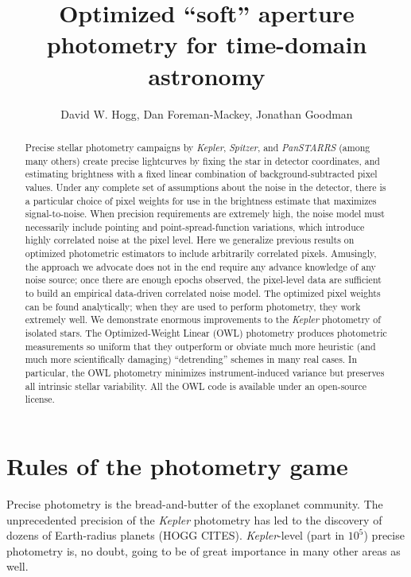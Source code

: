 \documentclass[12pt, letterpaper, preprint]{aastex}
\newcommand{\project}[1]{\textsl{#1}}
\begin{document}
\sloppy\sloppypar

\title{
  Optimized ``soft'' aperture photometry for time-domain astronomy
}
\author{
  David W. Hogg,
  Dan Foreman-Mackey,
  Jonathan Goodman
}

\begin{abstract}
Precise stellar photometry campaigns by \project{Kepler}, \project{Spitzer}, and \project{PanSTARRS}
  (among many others)
  create precise lightcurves by fixing the star in detector coordinates,
  and estimating brightness with a fixed linear combination of background-subtracted pixel values.
Under any complete set of assumptions about the noise in the detector,
  there is a particular choice of pixel weights for use in the brightness estimate
  that maximizes signal-to-noise.
When precision requirements are extremely high,
  the noise model must necessarily include pointing and point-spread-function variations,
  which introduce highly correlated noise at the pixel level.
Here we generalize previous results on optimized photometric estimators
  to include arbitrarily correlated pixels.
Amusingly, the approach we advocate does not in the end
  require any advance knowledge of any noise source;
  once there are enough epochs observed,
  the pixel-level data are sufficient to build an empirical data-driven correlated noise model.
The optimized pixel weights can be found analytically;
  when they are used to perform photometry, they work extremely well.
We demonstrate enormous improvements to the \project{Kepler} photometry of isolated stars.
The Optimized-Weight Linear (OWL) photometry produces photometric measurements so uniform that
  they outperform or obviate much more heuristic (and much more scientifically damaging)
  ``detrending'' schemes in many real cases.
In particular, the OWL photometry minimizes instrument-induced variance
  but preserves all intrinsic stellar variability.
All the OWL code is available under an open-source license.
\end{abstract}


\section{Rules of the photometry game}

Precise photometry is the bread-and-butter of the exoplanet community.
The unprecedented precision of the \project{Kepler} photometry has led to the discovery of
dozens of Earth-radius planets (HOGG CITES).
\project{Kepler}-level (part in $10^5$) precise photometry is, no doubt,
  going to be of great importance in many other areas as well.
\end{document}

